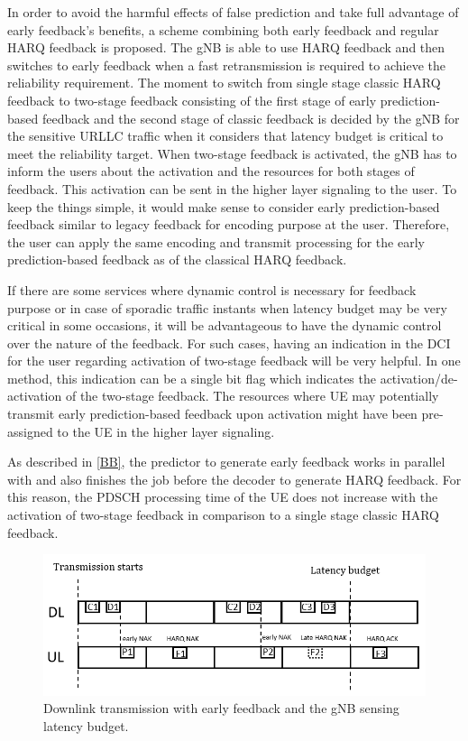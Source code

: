 \documentclass[conference]{IEEEtran}
\begin{document}
In order to avoid the harmful effects of false prediction and take full advantage of early feedback's benefits, a scheme combining both early feedback and regular HARQ feedback is proposed. The gNB is able to use HARQ feedback and then switches to early feedback when a fast retransmission is required to achieve the reliability requirement. The moment to switch from single stage classic HARQ feedback to two-stage feedback consisting of the first stage of early prediction-based feedback and the second stage of classic feedback is decided by the gNB for the sensitive URLLC traffic when it considers that latency budget is critical to meet the reliability target. When two-stage feedback is activated, the gNB has to inform the users about the activation and the resources for both stages of feedback. This activation can be sent in the higher layer signaling to the user. To keep the things simple, it would make sense to consider early prediction-based feedback similar to legacy feedback for encoding purpose at the user. Therefore, the user can apply the same encoding and transmit processing for the early prediction-based feedback as of the classical HARQ feedback.

If there are some services where dynamic control is necessary for feedback purpose or in case of sporadic traffic instants when latency budget may be very critical in some occasions, it will be advantageous to have the dynamic control over the nature of the feedback. For such cases, having an indication in the DCI for the user regarding activation of two-stage feedback will be very helpful. In one method, this indication can be a single bit flag which indicates the activation/de-activation of the two-stage feedback. The resources where UE may potentially transmit early prediction-based feedback upon activation might have been pre-assigned to the UE in the higher layer signaling.

As described in \ref{BB}, the predictor to generate early feedback works in parallel with and also finishes the job before the decoder to generate HARQ feedback. For this reason, the PDSCH processing time of the UE does not increase with the activation of two-stage feedback in comparison to a single stage classic HARQ feedback. 

\begin{figure}[htbp]
\centerline{\includegraphics[scale=0.4]{fig4.png}}
\caption{Downlink transmission with early feedback and the gNB sensing latency budget.}
\label{fig4}
\end{figure}
\end{document}
